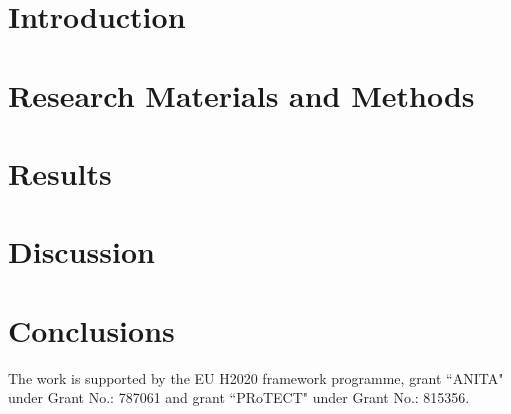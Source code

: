 \documentclass[manuscript, review, screen]{acmart}
\begin{document}
\section{Introduction}


\section{Research Materials and Methods}\label{mm}


\section{Results}\label{res}


\section{Discussion}\label{disc}


\section{Conclusions}\label{conc}


\begin{acks}
The work is supported by the EU H2020  framework programme, grant ``ANITA" under Grant No.: 787061 and grant ``PRoTECT" under Grant No.: 815356.
\end{acks}



\end{document}
